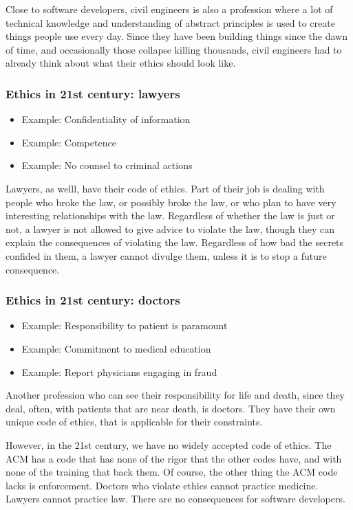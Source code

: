 Close to software developers,
civil engineers is also a profession where a lot of technical knowledge
and understanding of abstract principles is used to create
things people use every day.
Since they have been building things since the dawn of time,
and occasionally those collapse killing thousands,
civil engineers had to already think about what their ethics should look like.

\begin{frame}[fragile]
\frametitle{Ethics in 21st century: lawyers}

\begin{itemize}
\item Example: Confidentiality of information\pause
\item Example: Competence\pause
\item Example: No counsel to criminal actions
\end{itemize}

\end{frame}

Lawyers,
as welll,
have their code of ethics.
Part of their job is dealing with people who broke the law,
or possibly broke the law,
or who plan to have very interesting relationships with the law.
Regardless of whether the law is just or not,
a lawyer is not allowed to give advice to violate the law,
though they can explain the consequences of violating the law.
Regardless of how bad the secrets confided in them,
a lawyer cannot divulge them,
unless it is to stop a future consequence.

\begin{frame}[fragile]
\frametitle{Ethics in 21st century: doctors}

\begin{itemize}
\item Example: Responsibility to patient is paramount\pause
\item Example: Commitment to medical education\pause
\item Example: Report physicians engaging in fraud
\end{itemize}

\end{frame}

Another profession who can see their responsibility
for life and death,
since they deal,
often,
with patients that are near death,
is doctors.
They have their own unique code of ethics,
that is applicable for their constraints.

However,
in the 21st century,
we have no widely accepted code of ethics.
The ACM has a code that has none of the rigor
that the other codes have,
and with none of the training that back them.
Of course,
the other thing the ACM code lacks is enforcement.
Doctors who violate ethics cannot practice medicine.
Lawyers cannot practice law.
There are no consequences for software developers.


